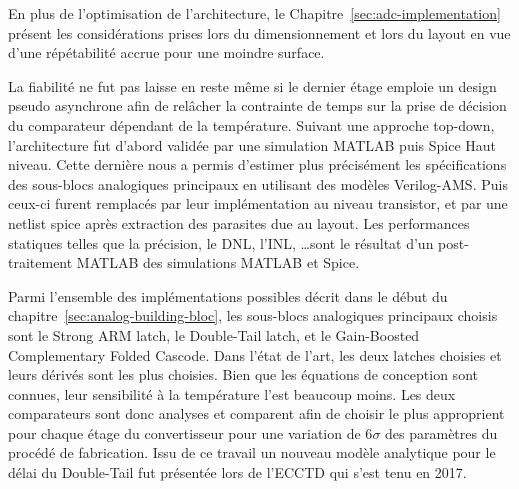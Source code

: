 \begin{mdframed}[linecolor=Prune,linewidth=1]
En plus de l'optimisation de l'architecture, le Chapitre~\ref{sec:adc-implementation} présent les considérations prises lors du dimensionnement et lors du layout en vue d'une répétabilité accrue pour une moindre surface.

La fiabilité ne fut pas laisse en reste même si le dernier étage emploie un design pseudo asynchrone afin de relâcher la contrainte de temps sur la prise de décision du comparateur dépendant de la température. Suivant une approche top-down, l'architecture fut d'abord validée par une simulation MATLAB puis Spice Haut niveau. Cette dernière nous a permis d'estimer plus précisément les spécifications des sous-blocs analogiques principaux en utilisant des modèles Verilog-AMS\@. Puis ceux-ci furent remplacés par leur implémentation au niveau transistor, et par une netlist spice après extraction des parasites due au layout. Les performances statiques telles que la précision, le DNL, l'INL, \ldots sont le résultat d'un post-traitement MATLAB des simulations MATLAB et Spice.

Parmi l'ensemble des implémentations possibles décrit dans le début du chapitre~\ref{sec:analog-building-bloc}, les sous-blocs analogiques principaux choisis sont le Strong ARM latch, le Double-Tail latch, et le Gain-Boosted Complementary Folded Cascode. Dans l'état de l'art, les deux latches choisies et leurs dérivés sont les plus choisies. Bien que les équations de conception sont connues, leur sensibilité à la température l'est beaucoup moins. Les deux comparateurs sont donc analyses et comparent afin de choisir le plus approprient pour chaque étage du convertisseur pour une variation de 6$\sigma$ des paramètres du procédé de fabrication. Issu de ce travail un nouveau modèle analytique pour le délai du Double-Tail fut présentée lors de l'ECCTD qui s'est tenu en 2017.


\end{mdframed}
